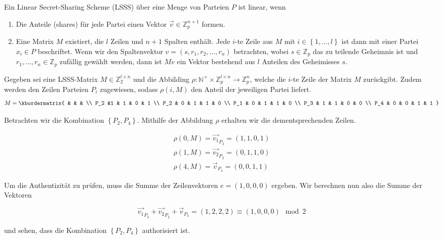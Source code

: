 \begin{definition}
	Ein Linear Secret-Sharing Scheme (LSSS) über eine Menge von Parteien $P$ ist
	linear, wenn

	\begin{enumerate}
		\item Die Anteile (shares) für jede Partei einen Vektor $\vec{v} \in
			\mathbb{Z}_p^{n+1}$ formen.
		\item Eine Matrix $M$ existiert, die $l$ Zeilen und $n+1$ Spalten enthält.
			Jede $i$-te Zeile aus $M$ mit $i \in \left\{1, ..., l\right\}$ ist dann
			mit einer Partei $x_i \in P$ beschriftet. Wenn wir den Spaltenvektor $v =
			\left(s, r_1, r_2, ..., r_n\right)$ betrachten, wobei $s \in \mathbb{Z}_p$ das zu
			teilende Geheimnis ist und $r_1, ..., r_n \in \mathbb{Z}_p$ zufällig
			gewählt werden, dann ist $Mv$ ein Vektor bestehend aus $l$ Anteilen des
			Geheimisses $s$.
	\end{enumerate}
\end{definition}

\begin{example}
	Gegeben sei eine LSSS-Matrix $M \in \mathbb{Z}_2^{l \times n}$ und die Abbilding $\rho : \mathbb{N^+}
	\times \mathbb{Z}_p^{l \times n} \to \mathbb{Z}_p^n$, welche die
	$i$-te Zeile der Matrix $M$ zurückgibt. Zudem werden den Zeilen Parteien
	$P_i$ zugewiesen, sodass $\rho(i, M)$ den Anteil der jeweiligen Partei liefert.
	$$M = \kbordermatrix{
				&   &   &   \\
		P_2 &1 & 1 & 0 & 1 \\
		P_2 &	0 & 1 & 1 & 0 \\
		P_1 &	0 & 1 & 1 & 0 \\
		P_3 &	1 & 1 & 0 & 0 \\
		P_4 &	0 & 0 & 1 & 1
		}$$

	Betrachten wir die Kombination $\left\{ P_2, P_4 \right\}$. Mithilfe der
	Abbildung $\rho$ erhalten wir die dementsprechenden Zeilen.

	\begin{align*}
		\rho\left(0, M\right) = \vec{v_1}_{P_2} = \left(1, 1, 0, 1\right) \\
		\rho\left(1, M\right) = \vec{v_2}_{P_2} = \left(0, 1, 1, 0\right) \\
		\rho\left(4, M\right) = \vec{v}_{P_4} = \left(0, 0, 1, 1\right)
	\end{align*}

	Um die Authentizität zu prüfen, muss die Summe der Zeilenvektoren $e =
	\left(1, 0, 0, 0\right)$ ergeben. Wir berechnen nun also die Summe der
	Vektoren
	
	$$\vec{v_1}_{P_2} + \vec{v_2}_{P_2} + \vec{v}_{P_4} = (1, 2, 2, 2) \equiv
	(1, 0, 0, 0) \mod 2$$

	und sehen, dass die Kombination $\left\{P_2, P_4\right\}$ authorisiert ist.
\end{example}

